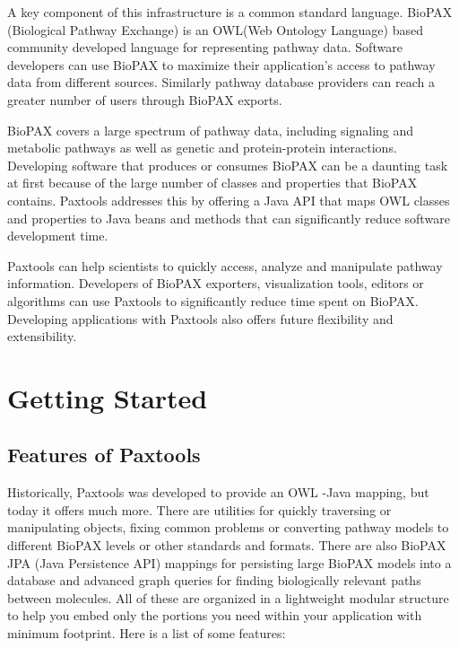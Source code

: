 \documentclass{tufte-book}
\begin{document}
A key component of this infrastructure is a common standard language. BioPAX (Biological Pathway Exchange) \cite{Demir2010} is an OWL(Web Ontology Language) based community developed language for representing pathway data. Software developers can use BioPAX to maximize their application's access to pathway data from different sources. Similarly pathway database providers can reach a greater number of users through BioPAX exports.

BioPAX covers a large spectrum of pathway data, including signaling and metabolic pathways as well as genetic and protein-protein interactions. Developing software that produces or consumes BioPAX can be a daunting task at first because of the large number of classes and properties that BioPAX contains. Paxtools addresses this by offering a Java API that maps OWL classes and properties to Java beans and methods that can significantly reduce software development time. 

Paxtools can help scientists to quickly access, analyze and manipulate pathway information. Developers of BioPAX exporters, visualization tools, editors or algorithms can use Paxtools to significantly reduce time spent on BioPAX. Developing applications with Paxtools also offers future flexibility and extensibility. 

\mainmatter


\chapter{Getting Started}
\label{ch:features}

\section{Features of Paxtools}

Historically, Paxtools was developed to provide an OWL -Java mapping, but today it offers much more. There are utilities for quickly traversing or manipulating objects, fixing common problems or converting pathway models to different BioPAX levels or other standards and formats. There are also BioPAX JPA (Java Persistence API) mappings for persisting large BioPAX models into a database and advanced graph queries for finding biologically relevant paths between molecules. All of these are organized in a lightweight modular structure to help you embed only the portions you need within your application with minimum footprint. Here is a list of some features:
\end{document}
